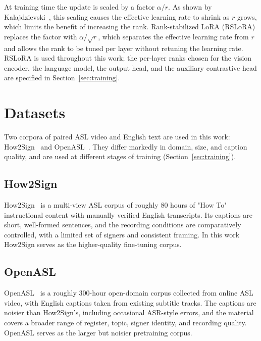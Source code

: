 \documentclass{article}
\begin{document}
At training time the update is scaled by a factor $\alpha / r$. As shown by
Kalajdzievski~\cite{kalajdzievski2023rslora}, this scaling causes the effective
learning rate to shrink as $r$ grows, which limits the benefit of increasing
the rank. Rank-stabilized LoRA (RSLoRA) replaces the factor with
$\alpha / \sqrt{r}$, which separates the effective learning rate from $r$ and
allows the rank to be tuned per layer without retuning the learning rate.
RSLoRA is used throughout this work; the per-layer ranks chosen for the vision
encoder, the language model, the output head, and the auxiliary contrastive
head are specified in Section~\ref{sec:training}.


\section{Datasets}
\label{sec:datasets}

Two corpora of paired ASL video and English text are used in this work:
How2Sign~\cite{duarte2021how2sign} and OpenASL~\cite{shi2022openasl}. They
differ markedly in domain, size, and caption quality, and are used at different
stages of training (Section~\ref{sec:training}).

\subsection{How2Sign}
\label{sec:data-how2sign}

How2Sign~\cite{duarte2021how2sign} is a multi-view ASL corpus of roughly 80
hours of "How To" instructional content with manually verified English
transcripts. Its captions are short, well-formed sentences, and the recording
conditions are comparatively controlled, with a limited set of signers and
consistent framing. In this work How2Sign serves as the higher-quality
fine-tuning corpus.

\subsection{OpenASL}
\label{sec:data-openasl}

OpenASL~\cite{shi2022openasl} is a roughly 300-hour open-domain corpus
collected from online ASL video, with English captions taken from existing
subtitle tracks. The captions are noisier than How2Sign's, including
occasional ASR-style errors, and the material covers a broader range of
register, topic, signer identity, and recording quality. OpenASL serves as the
larger but noisier pretraining corpus.
\end{document}
